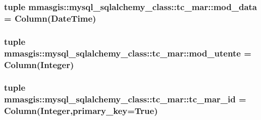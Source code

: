 \label{classmmasgis_1_1mysql__sqlalchemy__class_1_1tc__mar_ad8bbcbffeef82cb0a885d12744fde3d3}
\hypertarget{classmmasgis_1_1mysql__sqlalchemy__class_1_1tc__mar_ab73cf169685fdc0608631c400e353b39}{
\subsubsection[{mod\_\-data}]{\setlength{\rightskip}{0pt plus 5cm}tuple {\bf mmasgis::mysql\_\-sqlalchemy\_\-class::tc\_\-mar::mod\_\-data} = Column(DateTime)}}
\label{classmmasgis_1_1mysql__sqlalchemy__class_1_1tc__mar_ab73cf169685fdc0608631c400e353b39}
\hypertarget{classmmasgis_1_1mysql__sqlalchemy__class_1_1tc__mar_acfa294cf8e15e158f907f7425b2b1baa}{
\subsubsection[{mod\_\-utente}]{\setlength{\rightskip}{0pt plus 5cm}tuple {\bf mmasgis::mysql\_\-sqlalchemy\_\-class::tc\_\-mar::mod\_\-utente} = Column(Integer)}}
\label{classmmasgis_1_1mysql__sqlalchemy__class_1_1tc__mar_acfa294cf8e15e158f907f7425b2b1baa}
\hypertarget{classmmasgis_1_1mysql__sqlalchemy__class_1_1tc__mar_ae2a77eb754df3096723bbe75c3b594bb}{
\subsubsection[{tc\_\-mar\_\-id}]{\setlength{\rightskip}{0pt plus 5cm}tuple {\bf mmasgis::mysql\_\-sqlalchemy\_\-class::tc\_\-mar::tc\_\-mar\_\-id} = Column(Integer,primary\_\-key=True)}}
